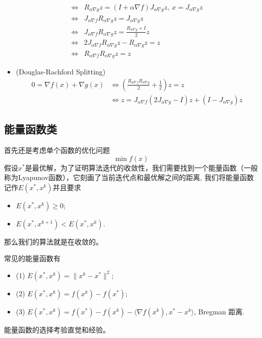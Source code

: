 \begin{itemize}
\begin{equation}
\begin{aligned}
            \Longleftrightarrow& R_{\alpha \nabla g}z = (I+\alpha \nabla f)J_{\alpha \nabla g}z , \ x=J_{\alpha \nabla g}z\\
            \Longleftrightarrow& J_{\alpha\nabla f}R_{\alpha \nabla g}z = J_{\alpha \nabla g}z\\
            \Longleftrightarrow& J_{\alpha\nabla f}R_{\alpha \nabla g}z = \frac{R_{\alpha \nabla g}+I}{2}z\\
            \Longleftrightarrow& 2J_{\alpha\nabla f}R_{\alpha \nabla g}z-R_{\alpha \nabla g}z= z\\
            \Longleftrightarrow& R_{\alpha\nabla f}R_{\alpha \nabla g}z= z
        \end{aligned}
    \end{equation}
    \item (Douglas-Rachford Splitting) 
    \begin{equation}
        \begin{aligned}
            0=\nabla f(x) + \nabla g(x)&\Longleftrightarrow(\frac{R_{\alpha\nabla f}R_{\alpha \nabla g}}{2}+\frac{1}{2})z= z\\
           &  \Longleftrightarrow z = J_{\alpha \nabla f}(2J_{\alpha\nabla g}-I)z +(I-J_{\alpha\nabla g})z
        \end{aligned}
    \end{equation}
\end{itemize}
\subsection{能量函数类}
首先还是考虑单个函数的优化问题
\begin{equation}\label{eq:opt_problem}
\min f(x)
\end{equation}
假设\(x^*\)是最优解，为了证明算法迭代的收敛性，我们需要找到一个能量函数（一般称为Lyapunov函数），它刻画了当前迭代点和最优解之间的距离, 我们将能量函数记作$E(x^*,x^k)$并且要求
\begin{itemize}
    \item $E(x^*,x^k) \geq 0$;
    \item $E(x^*,x^{k+1}) < E(x^*,x^k)$.
\end{itemize}
那么我们的算法就是在收敛的。

常见的能量函数有
\begin{itemize}
    \item (1) $E(x^*,x^k) = \|x^k - x^*\|^2$;
    \item (2) $E(x^*,x^k) = f(x^k) - f(x^*)$;
    \item (3) $E(x^*,x^k) = f(x^*) - f(x^k) -\langle\nabla f(x^k),x^*-x^k \rangle $, Bregman 距离.
\end{itemize}
\begin{remark}
    能量函数的选择考验直觉和经验。
\end{remark}

